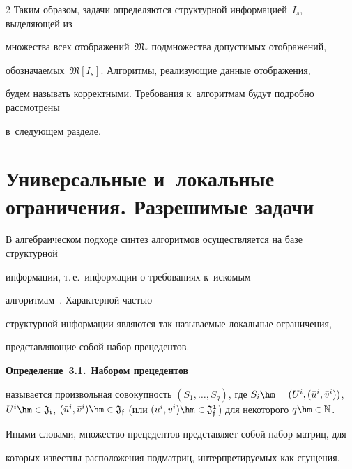 \begin{multicols}{2}
Таким образом, задачи определяются структурной информацией~$I_s$, выделяющей из 


множества всех отображений~$\mathfrak{M_*}$ подмножества допустимых отображений, 


обозначаемых~$\mathfrak{M}[I_s]$. Алгоритмы, реализующие данные отображения, 


будем называть корректными. Требования к~алгоритмам будут подробно рассмотрены 


в~следующем разделе.





\section{Универсальные и~локальные ограничения. Разрешимые  задачи}





В алгебраическом подходе синтез алгоритмов осуществляется на базе структурной 


информации, т.\,е.\ информации о требованиях к~искомым 


алгоритмам~\cite{Rudakov1,Rudakov2,Rudakov3,Rudakov4,Rudakov5}. Характерной частью 


структурной информации являются так называемые локальные ограничения, 


представляющие собой набор прецедентов.





\smallskip





\noindent


\textbf{Определение~3.1.}\ \textbf{Набором прецедентов}


называется произвольная совокупность $(S_1,\ldots,S_q)$, где $S_i \hm= (U^i , 


(\bar u^i, \bar v^i))$, $U^i \hm\in \mathfrak{J_i}$, $(\bar u^i, \bar v^i) \hm\in 


\mathfrak{J_f}$ (или $(u^i, v^i) \hm\in \mathfrak{J_f^1}$)   для некоторого $q \hm\in 


\mathbb{N}$.


Иными словами, множество прецедентов представляет собой набор матриц, для 


которых известны расположения подматриц, интерпретируемых как сгущения.






\end{multicols}
